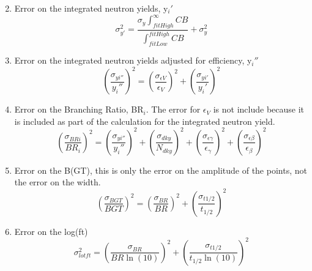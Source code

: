 \begin{enumerate}
\begin{equation}
    \label{eqn:errEnergy}
  \end{equation}
\item Error on the integrated neutron yields, y$_i'$
  \begin{equation}
    \sigma_{y'}^2 = \frac{\sigma_{y} \int_{fitHigh}^{\infty}CB}{\int_{fitLow}^{fitHigh}CB}
    + \sigma_y^2
    \label{eqn:errIntYield}
  \end{equation}
\item Error on the integrated neutron yields adjusted for efficiency, y$_i''$
  \begin{equation}
    \left(\frac{\sigma_{yi''}}{y_i''}\right)^2 = 
    \left(\frac{\sigma_{\epsilon V}}{\epsilon_V}\right)^2 + 
    \left(\frac{\sigma_{yi'}}{y_i'}\right)^2
    \label{eqn:errIntYieldEff}
  \end{equation}
\item Error on the Branching Ratio, BR$_i$. The error for $\epsilon_V$ is not include 
  because it is included as part of the calculation for the integrated neutron yield.
  \begin{equation}
    \left(\frac{\sigma_{BRi}}{BR_i}\right)^2 = 
    \left(\frac{\sigma_{yi''}}{y_i''}\right)^2 + 
    \left(\frac{\sigma_{dky}}{N_{dky}}\right)^2 +
    \left(\frac{\sigma_{\epsilon\gamma}}{\epsilon_\gamma}\right)^2 +
    \left(\frac{\sigma_{\epsilon\beta}}{\epsilon_\beta}\right)^2
    \label{eqn:errBR}
  \end{equation}
\item Error on the B(GT), this is only the error on the amplitude of the points, 
  not the error on the width.
  \begin{equation}
    \left(\frac{\sigma_{BGT}}{BGT}\right)^2 = 
    \left(\frac{\sigma_{BR}}{BR}\right)^2 + 
    \left(\frac{\sigma_{t1/2}}{t_{1/2}}\right)^2
    \label{eqn:errBGT}
  \end{equation}
\item Error on the log(ft)
  \begin{equation}
    \sigma_{lotft}^2 = \left(\frac{\sigma_{BR}}{BR\ln(10)}\right)^2 +
    \left(\frac{\sigma_{t1/2}}{t_{1/2}\ln(10)}\right)^2
    \label{eqn:errLogFT}
  \end{equation}
\end{enumerate}

